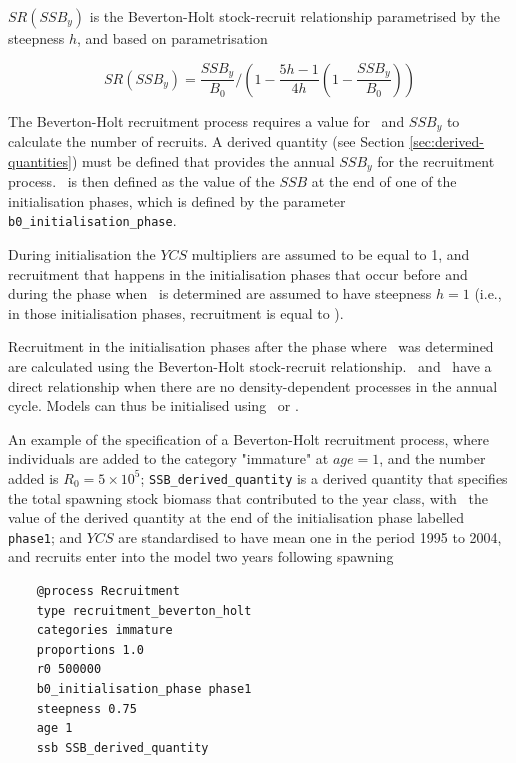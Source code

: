 $SR(SSB_y)$ is the Beverton-Holt stock-recruit relationship parametrised by the steepness $h$, and based on \cite{mace_doonan_88} parametrisation

\begin{equation}\label{eq:BH_SR}
SR(SSB_y) = \frac{SSB_y}{B_0} / \left( 1-\frac{5h-1}{4h} \left( 1-\frac{SSB_y}{B_0} \right) \right)
\end{equation}

The Beverton-Holt recruitment process requires a value for \Bzero\ and $SSB_y$ to calculate the number of recruits. A derived quantity (see Section \ref{sec:derived-quantities}) must be defined that provides the annual $SSB_y$ for the recruitment process. \Bzero\ is then defined as the value of the $SSB$ at the end of one of the initialisation phases, which is defined by the parameter \texttt{b0\_initialisation\_phase}.

During initialisation the $YCS$ multipliers are assumed to be equal to 1, and recruitment that happens in the initialisation phases that occur before and during the phase when \Bzero\ is determined are assumed to have steepness $h=1$ (i.e., in those initialisation phases, recruitment is equal to \Rzero).

Recruitment in the initialisation phases after the phase where \Bzero\ was determined are calculated using the Beverton-Holt stock-recruit relationship. \Rzero\ and \Bzero\ have a direct relationship when there are no density-dependent processes in the annual cycle. Models can thus be initialised using \Bzero\ or \Rzero.


An example of the specification of a Beverton-Holt recruitment process, where individuals are added to the category "immature" at $age=1$, and the number added is $R_0=5 \times 10^5$; \texttt{SSB\_derived\_quantity} is a derived quantity that specifies the total spawning stock biomass that contributed to the year class, with \Bzero\ the value of the derived quantity at the end of the initialisation phase labelled \texttt{phase1}; and $YCS$ are standardised to have mean one in the period 1995 to 2004, and recruits enter into the model two years following spawning

{\small{\begin{verbatim}
	@process Recruitment
	type recruitment_beverton_holt
	categories immature
	proportions 1.0
	r0 500000
	b0_initialisation_phase phase1
	steepness 0.75
	age 1
	ssb SSB_derived_quantity
	
\end{verbatim}}}

